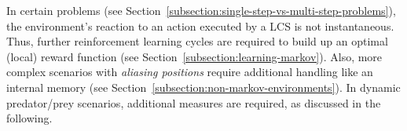 


In certain problems (see Section~\ref{subsection:single-step-vs-multi-step-problems}), the environment's reaction 
to an action executed by a LCS is not instantaneous. Thus, further reinforcement learning cycles are required to build up an optimal (local) reward function (see Section~\ref{subsection:learning-markov}). Also, more complex scenarios with \emph{aliasing positions} require additional handling like an internal memory (see Section~\ref{subsection:non-markov-environments}). In dynamic predator/prey scenarios, additional measures are required, as discussed in the following.


